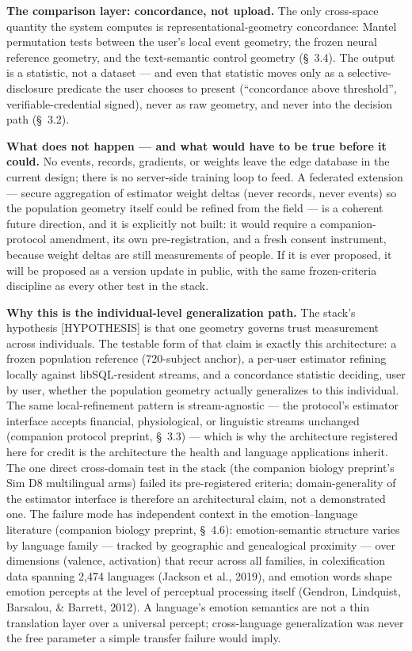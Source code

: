 \documentclass[
]{article}
\begin{document}
\textbf{The comparison layer: concordance, not upload.} The only
cross-space quantity the system computes is representational-geometry
concordance: Mantel permutation tests between the user's local event
geometry, the frozen neural reference geometry, and the text-semantic
control geometry (§~3.4). The output is a statistic, not a dataset ---
and even that statistic moves only as a selective-disclosure predicate
the user chooses to present (``concordance above threshold'',
verifiable-credential signed), never as raw geometry, and never into the
decision path (§~3.2).

\textbf{What does not happen --- and what would have to be true before
it could.} No events, records, gradients, or weights leave the edge
database in the current design; there is no server-side training loop to
feed. A federated extension --- secure aggregation of estimator weight
deltas (never records, never events) so the population geometry itself
could be refined from the field --- is a coherent future direction, and
it is explicitly not built: it would require a companion-protocol
amendment, its own pre-registration, and a fresh consent instrument,
because weight deltas are still measurements of people. If it is ever
proposed, it will be proposed as a version update in public, with the
same frozen-criteria discipline as every other test in the stack.

\textbf{Why this is the individual-level generalization path.} The
stack's hypothesis {[}HYPOTHESIS{]} is that one geometry governs trust
measurement across individuals. The testable form of that claim is
exactly this architecture: a frozen population reference (720-subject
anchor), a per-user estimator refining locally against libSQL-resident
streams, and a concordance statistic deciding, user by user, whether the
population geometry actually generalizes to this individual. The same
local-refinement pattern is stream-agnostic --- the protocol's estimator
interface accepts financial, physiological, or linguistic streams
unchanged (companion protocol preprint, §~3.3) --- which is why the
architecture registered here for credit is the architecture the health
and language applications inherit. The one direct cross-domain test in
the stack (the companion biology preprint's Sim D8 multilingual arms)
failed its pre-registered criteria; domain-generality of the estimator
interface is therefore an architectural claim, not a demonstrated one.
The failure mode has independent context in the emotion--language
literature (companion biology preprint, §~4.6): emotion-semantic
structure varies by language family --- tracked by geographic and
genealogical proximity --- over dimensions (valence, activation) that
recur across all families, in colexification data spanning 2,474
languages (Jackson et al., 2019), and emotion words shape emotion
percepts at the level of perceptual processing itself (Gendron,
Lindquist, Barsalou, \& Barrett, 2012). A language's emotion semantics
are not a thin translation layer over a universal percept;
cross-language generalization was never the free parameter a simple
transfer failure would imply.
\end{document}
